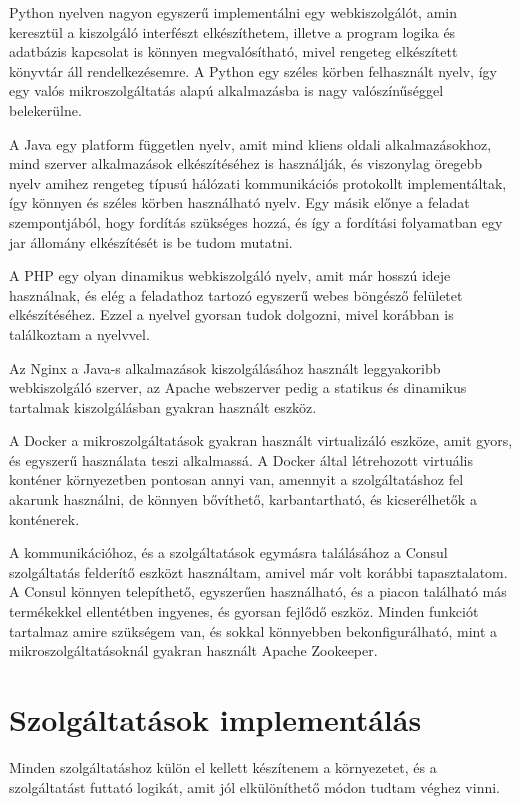 \documentclass[11pt,magyar,a4paper,twoside,]{report}
\begin{document}
Python nyelven nagyon egyszerű implementálni egy webkiszolgálót, amin
keresztül a kiszolgáló interfészt elkészíthetem, illetve a program
logika és adatbázis kapcsolat is könnyen megvalósítható, mivel rengeteg
elkészített könyvtár áll rendelkezésemre. A Python egy széles körben
felhasznált nyelv, így egy valós mikroszolgáltatás alapú alkalmazásba is
nagy valószínűséggel belekerülne.

A Java egy platform független nyelv, amit mind kliens oldali
alkalmazásokhoz, mind szerver alkalmazások elkészítéséhez is használják,
és viszonylag öregebb nyelv amihez rengeteg típusú hálózati
kommunikációs protokollt implementáltak, így könnyen és széles körben
használható nyelv. Egy másik előnye a feladat szempontjából, hogy
fordítás szükséges hozzá, és így a fordítási folyamatban egy jar
állomány elkészítését is be tudom mutatni.

A PHP egy olyan dinamikus webkiszolgáló nyelv, amit már hosszú ideje
használnak, és elég a feladathoz tartozó egyszerű webes böngésző
felületet elkészítéséhez. Ezzel a nyelvel gyorsan tudok dolgozni, mivel
korábban is találkoztam a nyelvvel.

Az Nginx a Java-s alkalmazások kiszolgálásához használt leggyakoribb
webkiszolgáló szerver, az Apache webszerver pedig a statikus és
dinamikus tartalmak kiszolgálásban gyakran használt eszköz.

A Docker a mikroszolgáltatások gyakran használt virtualizáló eszköze,
amit gyors, és egyszerű használata teszi alkalmassá. A Docker által
létrehozott virtuális konténer környezetben pontosan annyi van, amennyit
a szolgáltatáshoz fel akarunk használni, de könnyen bővíthető,
karbantartható, és kicserélhetők a konténerek.

A kommunikációhoz, és a szolgáltatások egymásra találásához a Consul
szolgáltatás felderítő eszközt használtam, amivel már volt korábbi
tapasztalatom. A Consul könnyen telepíthető, egyszerűen használható, és
a piacon található más termékekkel ellentétben ingyenes, és gyorsan
fejlődő eszköz. Minden funkciót tartalmaz amire szükségem van, és sokkal
könnyebben bekonfigurálható, mint a mikroszolgáltatásoknál gyakran
használt Apache Zookeeper.

\section{Szolgáltatások
implementálás}\label{szolguxe1ltatuxe1sok-implementuxe1luxe1s}

Minden szolgáltatáshoz külön el kellett készítenem a környezetet, és a
szolgáltatást futtató logikát, amit jól elkülöníthető módon tudtam
véghez vinni.
\end{document}
